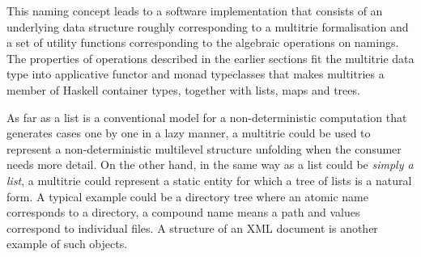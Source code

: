 \documentclass{article}
\theoremstyle{definition}
\begin{document}
This naming concept leads to a software implementation that consists of an
underlying data structure roughly corresponding to a multitrie formalisation
and a set of utility functions corresponding to the algebraic operations on
namings. The properties of operations described in the earlier sections fit
the multitrie data type into applicative functor and monad
typeclasses that makes multitries a member of Haskell container types,
together with lists, maps and trees.

As far as a list is a conventional model for a non-deterministic computation
that generates cases one by one in a lazy manner, a multitrie could be used to
represent a non-deterministic multilevel structure unfolding when the consumer
needs more detail.  On the other hand, in the same way as a list could be
\emph{simply a list}, a multitrie could represent a static entity for which a
tree of lists is a natural form. A typical example could be a directory tree
where an atomic name corresponds to a directory, a compound name means a path
and values correspond to individual files.  A structure of an XML document is
another example of such objects.
\end{document}
